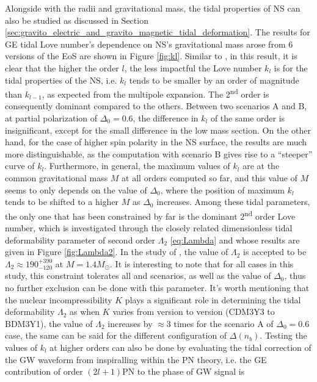Alongside with the radii and gravitational mass, the tidal properties of \gls{NS} can also be studied as discussed in Section \ref{sec:gravito_electric_and_gravito_magnetic_tidal_deformation}. The results for \gls{GE} tidal Love number's dependence on \gls{NS}'s gravitational mass arose from 6 versions of the \gls{EoS} are shown in Figure \ref{fig:kl}. Similar to \cite{perot2021role}, in this result, it is clear that the higher the order $l$, the less impactful the Love number $k_l$ is for the tidal properties of the \gls{NS}, i.e. $k_l$ tends to be smaller by an order of magnitude than $k_{l-1}$, as expected from the multipole expansion. The 2\textsuperscript{nd} order is consequently dominant compared to the others. Between two scenarios A and B, at partial polarization of $\Delta_0 = 0.6$, the difference in $k_l$ of the same order is insignificant, except for the small difference in the low mass section. On the other hand, for the case of higher spin polarity in the \gls{NS} surface, the results are much more distinguishable, as the computation with scenario B gives rise to a ``steeper'' curve of $k_l$. Furthermore, in general, the maximum values of $k_l$ are at the common gravitational mass $M$ at all orders computed so far, and this value of $M$ seems to only depends on the value of $\Delta_0$, where the position of maximum $k_l$ tends to be shifted to a higher $M$ as $\Delta_0$ increases. Among these tidal parameters, the only one that has been constrained by far is the dominant 2\textsuperscript{nd} order Love number, which is investigated through the closely related dimensionless tidal deformability parameter of second order $\Lambda_2$ \eqref{eq:Lambda} and whose results are given in Figure \ref{fig:Lambda2}. In the study of \cite{abbott2018gw170817}, the value of $\Lambda_2$ is accepted to be $\Lambda_2 \approx 190^{+390}_{-120}$ at $M=1.4M_\odot$. It is interesting to note that for all cases in this study, this constraint tolerates all  and scenarios, as well as the value of $\Delta_0$, thus no further exclusion can be done with this parameter. It's worth mentioning that the nuclear incompressibility $K$ plays a significant role in determining the tidal deformability $\Lambda_2$ as when $K$ varies from version to version (CDM3Y3 to BDM3Y1), the value of $\Lambda_2$ increases by $\approx 3$ times for the scenario A of $\Delta_0 = 0.6$ case, the same can be said for the different configuration of $\Delta(n_b)$. Testing the values of $k_l$ at higher orders can also be done by evaluating the tidal correction of the \gls{GW} waveform from inspiralling  within the PN theory, i.e. the \gls{GE} contribution of order $(2l+1)$PN to the phase of \gls{GW} signal is \citep{perot2021role, yagi2014multipole}

